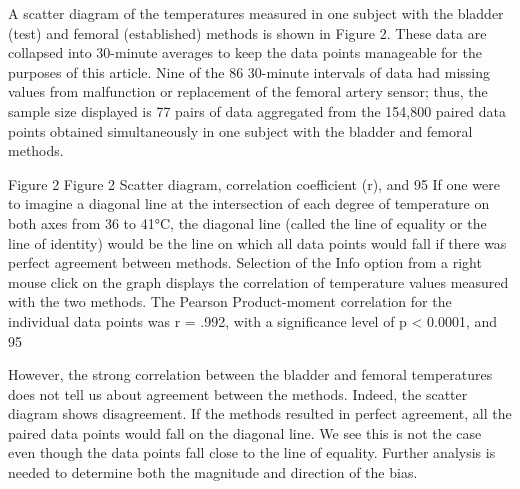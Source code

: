 \documentclass[]{article}
\begin{document}
A scatter diagram of the temperatures measured in one subject with the bladder (test) and femoral (established) methods is shown in Figure 2. These data are collapsed into 30-minute averages to keep the data points manageable for the purposes of this article. Nine of the 86 30-minute intervals of data had missing values from malfunction or replacement of the femoral artery sensor; thus, the sample size displayed is 77 pairs of data aggregated from the 154,800 paired data points obtained simultaneously in one subject with the bladder and femoral methods.

Figure 2
Figure 2
Scatter diagram, correlation coefficient (r), and 95 %
If one were to imagine a diagonal line at the intersection of each degree of temperature on both axes from 36 to 41°C, the diagonal line (called the line of equality or the line of identity) would be the line on which all data points would fall if there was perfect agreement between methods. Selection of the Info option from a right mouse click on the graph displays the correlation of temperature values measured with the two methods. The Pearson Product-moment correlation for the individual data points was r = .992, with a significance level of p < 0.0001, and 95%

However, the strong correlation between the bladder and femoral temperatures does not tell us about agreement between the methods. Indeed, the scatter diagram shows disagreement. If the methods resulted in perfect agreement, all the paired data points would fall on the diagonal line. We see this is not the case even though the data points fall close to the line of equality. Further analysis is needed to determine both the magnitude and direction of the bias.
\end{document}
